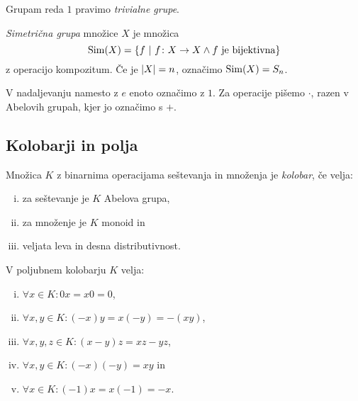 \begin{definicija}
Grupam reda $1$ pravimo
\emph{trivialne grupe}.
\end{definicija}

\begin{definicija}
\emph{Simetrična grupa}
množice $X$ je množica
\[
\operatorname{Sim}(X)=\left\{f~\middle\vert~f\colon X\to X\land\text{$f$ je bijektivna}\right\}
\]
z operacijo kompozitum. Če je $\left\lvert X\right\rvert=n$, označimo $\operatorname{Sim}(X)=S_n$.
\end{definicija}

\begin{opomba}
V nadaljevanju namesto z $e$ enoto označimo z $1$. Za operacije
pišemo $\cdot$, razen v Abelovih grupah, kjer jo označimo s $+$.
\end{opomba}

\newpage

\subsection{Kolobarji in polja}


\begin{definicija}
Množica $K$ z binarnima operacijama seštevanja in množenja je
\emph{kolobar}, če velja:

\begin{enumerate}[i)]
\item za seštevanje je $K$ Abelova grupa,
\item za množenje je $K$ monoid in
\item veljata leva in desna distributivnost.
\end{enumerate}
\end{definicija}

\begin{trditev}
V poljubnem kolobarju $K$ velja:

\begin{enumerate}[i)]
\item $\forall x \in K \colon 0x = x0 = 0$,
\item $\forall x, y \in K \colon (-x)y = x(-y) = -(xy)$,
\item $\forall x, y, z \in K \colon (x-y)z = xz - yz$,
\item $\forall x, y \in K \colon (-x)(-y) = xy$ in
\item $\forall x \in K \colon (-1)x = x(-1) = -x$.
\end{enumerate}
\end{trditev}

